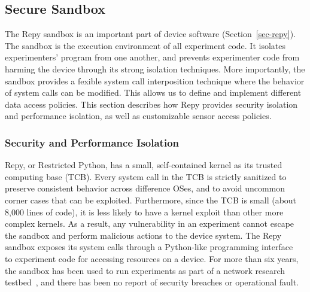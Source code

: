 \subsection{Secure Sandbox}\label{sec-repy-ext}

The Repy sandbox is an important part of device software 
(Section~\ref{sec-repy}). The sandbox is the execution environment 
of all experiment code. It isolates experimenters' program from one 
another, and prevents experimenter code from harming the device 
through its strong isolation techniques. More importantly, the sandbox
provides a fexible system call interposition technique where the behavior 
of system calls can be modified. This allows us to define and implement
different data access policies. This section describes how Repy provides
security isolation and performance isolation, as well as customizable
sensor access policies.

\subsubsection{Security and Performance Isolation}

Repy, or Restricted Python, has a small, self-contained kernel as its trusted 
computing base (TCB). %
Every system call in the TCB is strictly 
sanitized to preserve consistent behavior across difference OSes, 
and to avoid uncommon corner cases that can be exploited. 
Furthermore, since the TCB is small (about 8,000 lines of code), it is 
less likely to have a kernel exploit than other more complex kernels. 
As a result, any vulnerability in an experiment 
cannot escape the sandbox and perform malicious actions to 
the device system. The Repy sandbox exposes its system calls 
through a Python-like programming interface~\cite{repyv2} to 
experiment code for accessing resources on a device. 
For more than six years, the
sandbox has been used to run experiments as part of a network research 
testbed~\cite{seattle}, and there has been no report of security 
breaches or operational fault. 

